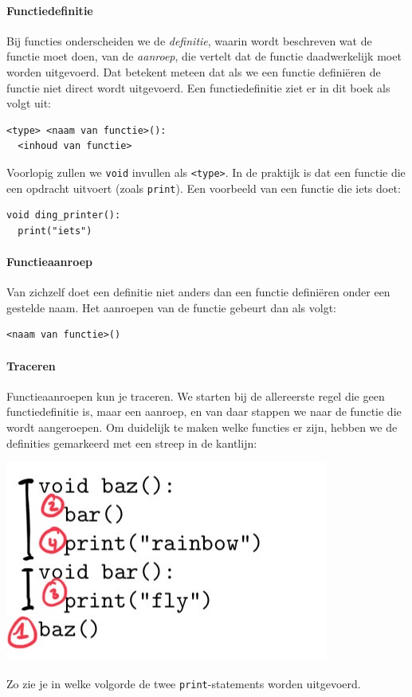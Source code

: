 \paragraph{Functiedefinitie}

Bij functies onderscheiden we de \emph{definitie}, waarin wordt beschreven wat de functie moet doen, van de \emph{aanroep}, die vertelt dat de functie daadwerkelijk moet worden uitgevoerd. Dat betekent meteen dat als we een functie defini\"eren de functie niet direct wordt uitgevoerd. Een functiedefinitie ziet er in dit boek als volgt uit:

\begin{verbatim}
<type> <naam van functie>():
  <inhoud van functie>
\end{verbatim}

Voorlopig zullen we \texttt{void} invullen als \texttt{<type>}. In de praktijk is dat een functie die een opdracht uitvoert (zoals \texttt{print}). Een voorbeeld van een functie die iets doet:

\begin{verbatim}
void ding_printer():
  print("iets")
\end{verbatim}

\paragraph{Functieaanroep}

Van zichzelf doet een definitie niet anders dan een functie defini\"eren onder een gestelde naam. Het aanroepen van de functie gebeurt dan als volgt:

\begin{verbatim}
<naam van functie>()
\end{verbatim}

\paragraph{Traceren} Functieaanroepen kun je traceren. We starten bij de allereerste regel die geen functiedefinitie is, maar een aanroep, en van daar stappen we naar de functie die wordt aangeroepen. Om duidelijk te maken welke functies er zijn, hebben we de definities gemarkeerd met een streep in de kantlijn:

\includegraphics[width=.4\textwidth]{1-trace-calls.jpeg}

Zo zie je in welke volgorde de twee \texttt{print}-statements worden uitgevoerd.
